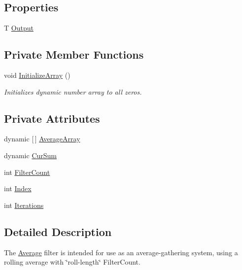 \subsection*{Properties}
\begin{DoxyCompactItemize}
\item 
T \hyperlink{class_robotics_library_1_1_filters_1_1_average_aa59efec0916673c66b3507c4360c619e}{Output}
\end{DoxyCompactItemize}
\subsection*{Private Member Functions}
\begin{DoxyCompactItemize}
\item 
void \hyperlink{class_robotics_library_1_1_filters_1_1_average_af2d308005d9067a43cbb9968147b26dd}{Initialize\+Array} ()
\begin{DoxyCompactList}\small\item\em Initializes dynamic number array to all zeros.\end{DoxyCompactList}\end{DoxyCompactItemize}
\subsection*{Private Attributes}
\begin{DoxyCompactItemize}
\item 
dynamic \mbox{[}$\,$\mbox{]} \hyperlink{class_robotics_library_1_1_filters_1_1_average_abed97fe2d89a039ac76c7db768904fd5}{Average\+Array}
\item 
dynamic \hyperlink{class_robotics_library_1_1_filters_1_1_average_ab608142086c076a293b275fdfbfdf149}{Cur\+Sum}
\item 
int \hyperlink{class_robotics_library_1_1_filters_1_1_average_a8db578c17df74d38278a0bcc18ca1d49}{Filter\+Count}
\item 
int \hyperlink{class_robotics_library_1_1_filters_1_1_average_a22cecd8257b383616e9e581c5b61b3f5}{Index}
\item 
int \hyperlink{class_robotics_library_1_1_filters_1_1_average_a8ba4cd3fbcc9b94839a9a023c6b95732}{Iterations}
\end{DoxyCompactItemize}


\subsection{Detailed Description}
The \hyperlink{class_robotics_library_1_1_filters_1_1_average}{Average} filter is intended for use as an average-\/gathering system, using a rolling average with \char`\"{}roll-\/length\char`\"{} {\ttfamily Filter\+Count}.

